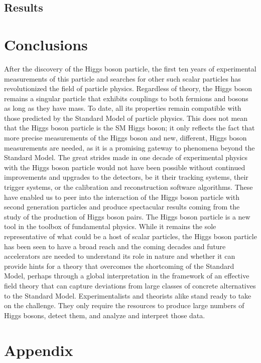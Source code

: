 \documentclass[11pt]{article}
\begin{document}
\subsection{Results}
\label{sec:org557d9db}
\section{Conclusions}
\label{sec:org62e9242}
After the discovery of the Higgs boson particle, the first ten years of experimental measurements of this particle and searches for
other such scalar particles has revolutionized the field of particle physics.
Regardless of theory, the Higgs boson remains a singular particle that exhibits couplings to both fermions and bosons as long as they have mass.
To date, all its properties remain compatible with those predicted by the Standard Model of particle physics.
This does not mean that the Higgs boson particle is the SM Higgs boson; it only reflects the fact that more precise measurements
of the Higgs boson and new, different, Higgs boson measurements are needed, as it is a promising gateway to phenomena beyond the
Standard Model.
The great strides made in one decade of experimental physics with the Higgs boson particle would not have been possible without continued improvements and upgrades to the detectors, be it their tracking systems, their trigger systems, or the calibration and reconstruction software algorithms.
These have enabled us to peer into the interaction of the Higgs boson particle with second generation particles and produce spectacular results coming from the study of the production of Higgs boson pairs.
The Higgs boson particle is a new tool in the toolbox of fundamental physics.
While it remains the sole representative of what could be a host of scalar particles, the Higgs boson particle has been seen to have a broad reach and the coming decades and future accelerators are needed to understand its role in nature and whether it can provide hints for a theory that overcomes the shortcoming of the Standard Model, perhaps through a
global interpretation in the framework of an effective field theory that can capture deviations from large classes of concrete
alternatives to the Standard Model.
Experimentalists and theorists alike stand ready to take on the challenge.
They only require the resources to produce large numbers of Higgs bosons, detect them, and analyze and interpret those data.
\cite{andre_david_higgs_ten_years}
\section{Appendix}
\label{sec:org7fe5ebc}
\end{document}
